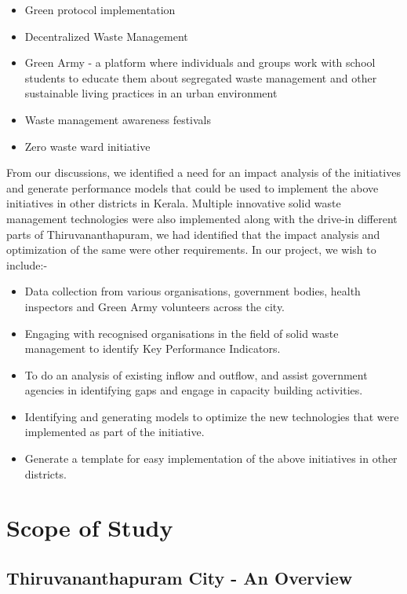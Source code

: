 \documentclass[12pt,a4paper]{report}
\begin{document}
\begin{itemize}
\item Green protocol implementation
\item Decentralized Waste Management
\item Green Army - a platform where individuals and groups work with school students to educate them about  segregated waste management and other sustainable living practices in an urban environment
\item Waste management awareness festivals
\item Zero waste ward initiative
\end{itemize}

From our discussions, we identified a need for an impact analysis of the initiatives and generate performance models that could be used to implement the above initiatives in other districts in Kerala. Multiple innovative solid waste management technologies were also implemented along with the drive-in different parts of Thiruvananthapuram, we had identified that the impact analysis and optimization of the same were other requirements.
In our project, we wish to include:-

\begin{itemize}
\item Data collection from various organisations, government bodies, health inspectors and Green Army volunteers across the city.
\item Engaging with recognised organisations in the field of solid waste management to identify Key Performance Indicators.
\item To do an analysis of existing inflow and outflow, and assist government agencies in identifying gaps and engage in capacity building activities.
\item Identifying and generating models to optimize the new technologies that were implemented as part of the initiative.
\item Generate a template for easy implementation of the above initiatives in other districts.
\end{itemize}

\chapter{\textbf{Scope of Study}}

\section{Thiruvananthapuram City - An Overview}
\end{document}
